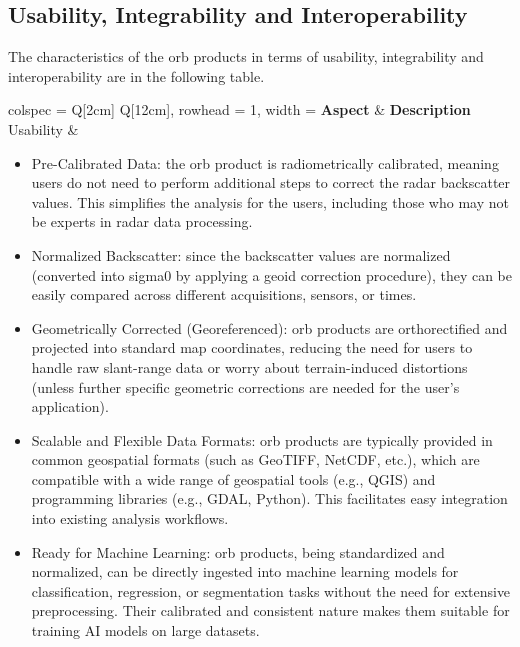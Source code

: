 \subsection{Usability, Integrability and Interoperability}
\label{sec:orb_usability_integrability}
The characteristics of the \acs{orb} products in terms of usability, integrability and interoperability  are in the following table.

\begin{longtblr}[
  caption = {Usability, Integrability, and Interoperability of \acs{orb} product},
  label = {tab:orb_usability_integrability_interoperability},
]{
  colspec = {Q[2cm] Q[12cm]},
  rowhead = 1,
  width = \linewidth
}
\hline
\textbf{Aspect} & \textbf{Description} \\
\hline
Usability &
\begin{itemize}
    \item Pre-Calibrated Data: the \acs{orb} product is radiometrically calibrated, meaning users do not need to perform additional steps to correct the radar backscatter values. This simplifies the analysis for the users, including those who may not be experts in radar data processing.
    \item Normalized Backscatter: since the backscatter values are normalized (converted into \gls{sigma0} by applying a geoid correction procedure), they can be easily compared across different acquisitions, sensors, or times. 
    \item Geometrically Corrected (Georeferenced): \acs{orb} products are orthorectified and projected into standard map coordinates, reducing the need for users to handle raw slant-range data or worry about terrain-induced distortions (unless further specific geometric corrections are needed for the user's application).
    \item Scalable and Flexible Data Formats: \acs{orb} products are typically provided in common geospatial formats (such as GeoTIFF, NetCDF, etc.), which are compatible with a wide range of geospatial tools (e.g., QGIS) and programming libraries (e.g., GDAL, Python). This facilitates easy integration into existing analysis workflows.
    \item Ready for Machine Learning: \acs{orb} products, being standardized and normalized, can be directly ingested into machine learning models for classification, regression, or segmentation tasks without the need for extensive preprocessing. Their calibrated and consistent nature makes them suitable for training AI models on large datasets.
\end{itemize}

\end{longtblr}
